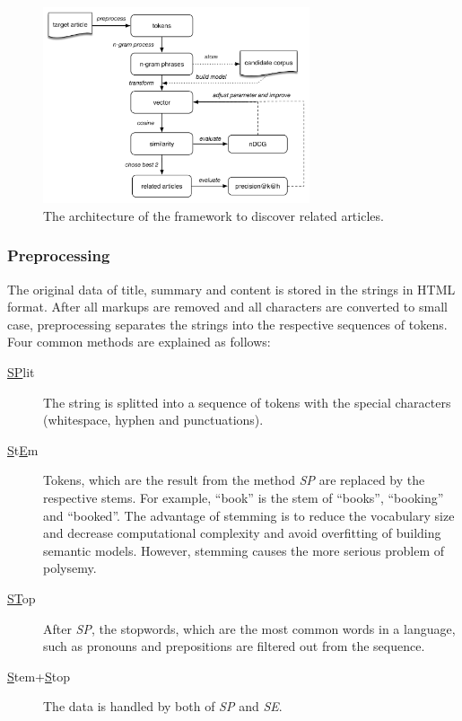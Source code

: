 \begin{figure}[!htb]
    \centering
    \includegraphics[width=0.7\textwidth]{fig/unsupervise}
    \caption{The architecture of the framework to discover related articles.}
    \label{fig:unsupervised}
\end{figure}


\subsubsection{Preprocessing}
The original data of title, summary and content is stored in the strings in HTML format. After all markups are removed and all characters are converted to small case, preprocessing separates the strings into the respective sequences of tokens. Four common methods are explained as follows:

\begin{description}
\item[\underline{SP}lit] The string is splitted into a sequence of tokens with the special characters (whitespace, hyphen and punctuations). 
\item[\underline{S}t\underline{E}m] Tokens, which are the result from the method \textit{SP} are replaced by the respective stems. For example, ``book'' is the stem of ``books'', ``booking'' and ``booked''. The advantage of stemming is to reduce the vocabulary size and decrease computational complexity and avoid overfitting of building semantic models. However, stemming causes the more serious problem of polysemy. 
\item[\underline{ST}op] After \textit{SP}, the stopwords, which are the most common words in a language, such as pronouns and prepositions are filtered out from the sequence. 
\item[\underline{S}tem+\underline{S}top] The data is handled by both of \textit{SP} and \textit{SE}. 
\end{description}

